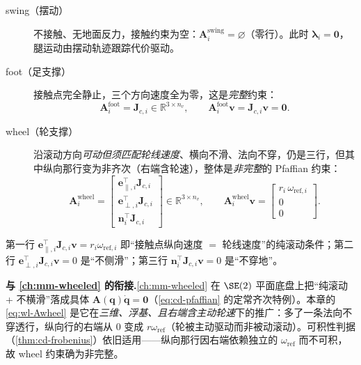 \begin{description}
  \item[\;swing（摆动）] 不接触、无地面反力，接触约束为空：$\mathbf{A}_i^{\mathrm{swing}}=\varnothing$（零行）。此时 $\boldsymbol\lambda_i=\mathbf{0}$，腿运动由摆动轨迹跟踪代价驱动。
  \item[\;foot（足支撑）] 接触点完全静止，三个方向速度全为零，这是\emph{完整}约束：
  \begin{equation}
    \mathbf{A}_i^{\mathrm{foot}}=\mathbf{J}_{c,i}\in\mathbb{R}^{3\times n_v},\qquad \mathbf{A}_i^{\mathrm{foot}}\mathbf{v}=\mathbf{J}_{c,i}\mathbf{v}=\mathbf{0}.
    \label{eq:wl-Afoot}
  \end{equation}
  \item[\;wheel（轮支撑）] 沿滚动方向\emph{可动但须匹配轮线速度}、横向不滑、法向不穿，仍是三行，但其中纵向那行变为非齐次（右端含轮速），整体是\emph{非完整}的 Pfaffian 约束：
  \begin{equation}
    \mathbf{A}_i^{\mathrm{wheel}}=
    \begin{bmatrix} \mathbf{e}_{\parallel,i}^\top\mathbf{J}_{c,i}\\[1pt] \mathbf{e}_{\perp,i}^\top\mathbf{J}_{c,i}\\[1pt] \mathbf{n}_i^\top\mathbf{J}_{c,i}\end{bmatrix}\in\mathbb{R}^{3\times n_v},\qquad
    \mathbf{A}_i^{\mathrm{wheel}}\mathbf{v}=
    \begin{bmatrix} r_i\,\omega_{\mathrm{ref},i}\\ 0\\ 0\end{bmatrix}.
    \label{eq:wl-Awheel}
  \end{equation}
\end{description}

第一行 $\mathbf{e}_{\parallel,i}^\top\mathbf{J}_{c,i}\mathbf{v}=r_i\omega_{\mathrm{ref},i}$ 即“接触点纵向速度 $=$ 轮线速度”的纯滚动条件；第二行 $\mathbf{e}_{\perp,i}^\top\mathbf{J}_{c,i}\mathbf{v}=0$ 是“不侧滑”；第三行 $\mathbf{n}_i^\top\mathbf{J}_{c,i}\mathbf{v}=0$ 是“不穿地”。

\begin{note}
\textbf{与 \cref{ch:mm-wheeled} 的衔接.}\;\cref{ch:mm-wheeled} 在 $\SE(2)$ 平面底盘上把“纯滚动 + 不横滑”落成具体 $\mathbf{A}(\mathbf{q})\dot{\mathbf{q}}=\mathbf{0}$（\cref{eq:cd-pfaffian} 的定常齐次特例）。本章的 \cref{eq:wl-Awheel} 是它在\emph{三维、浮基、且右端含主动轮速}下的推广：多了一条法向不穿透行，纵向行的右端从 $0$ 变成 $r\omega_{\mathrm{ref}}$（轮被主动驱动而非被动滚动）。可积性判据（\cref{thm:cd-frobenius}）依旧适用——纵向那行因右端依赖独立的 $\omega_{\mathrm{ref}}$ 而不可积，故 wheel 约束确为非完整。
\end{note}

